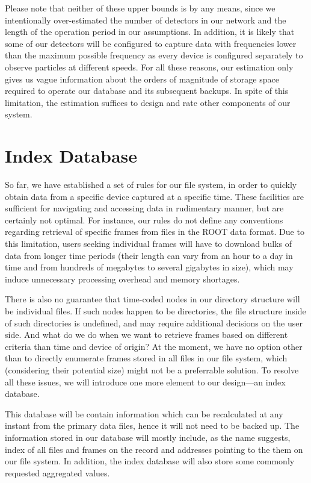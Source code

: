 Please note that neither of these upper bounds is by any means, since we intentionally over-estimated the number of detectors in our network and the length of the operation period in our assumptions. In addition, it is likely that some of our detectors will be configured to capture data with frequencies lower than the maximum possible frequency as every device is configured separately to observe particles at different speeds. For all these reasons, our estimation only gives us vague information about the orders of magnitude of storage space required to operate our database and its subsequent backups. In spite of this limitation, the estimation suffices to design and rate other components of our system. 


\section{Index Database}
So far, we have established a set of rules for our file system, in order to quickly obtain data from a specific device captured at a specific time. These facilities are sufficient for navigating and accessing data in rudimentary manner, but are certainly not optimal. For instance, our rules do not define any conventions regarding retrieval of specific frames from files in the ROOT data format. Due to this limitation, users seeking individual frames will have to download bulks of data from longer time periods (their length can vary from an hour to a day in time and from hundreds of megabytes to several gigabytes in size), which may induce unnecessary processing overhead and memory shortages.

There is also no guarantee that time-coded nodes in our directory structure will be individual files. If such nodes happen to be directories, the file structure inside of such directories is undefined, and may require additional decisions on the user side. And what do we do when we want to retrieve frames based on different criteria than time and device of origin? At the moment, we have no option other than to directly enumerate frames stored in all files in our file system, which (considering their potential size) might not be a preferrable solution. To resolve all these issues, we will introduce one more element to our design---an index database.

This database will be contain information which can be recalculated at any instant from the primary data files, hence it will not need to be backed up. The information stored in our database will mostly include, as the name suggests, index of all files and frames on the record and addresses pointing to the them on our file system. In addition, the index database will also store some commonly requested aggregated values.



